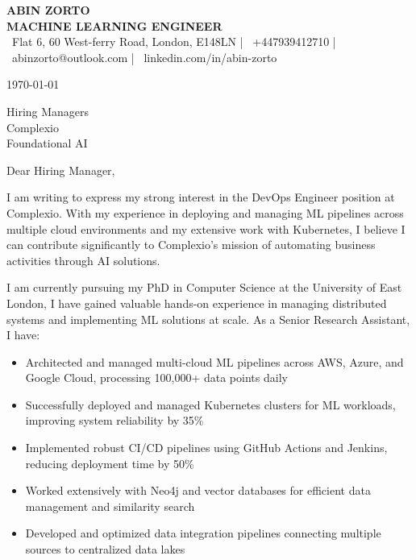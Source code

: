 \documentclass[10pt,a4paper]{article}
\begin{document}

\begin{center}
    {\color{primary}\Large\textbf{ABIN ZORTO}}\\[0.2em]
    {\color{secondary}\large\textbf{MACHINE LEARNING ENGINEER}}\\[0.3em]
    
    \small\color{secondary}
    \faMapMarker\ Flat 6, 60 West-ferry Road, London, E148LN |
    \faMobile\ +447939412710 |
    \faEnvelope\ abinzorto@outlook.com |
    \faLinkedin\ linkedin.com/in/abin-zorto
\end{center}

\vspace{1em}
\today

\vspace{1em}
Hiring Managers\\
Complexio\\
Foundational AI

\vspace{1em}
Dear Hiring Manager,

I am writing to express my strong interest in the DevOps Engineer position at Complexio. With my experience in deploying and managing ML pipelines across multiple cloud environments and my extensive work with Kubernetes, I believe I can contribute significantly to Complexio's mission of automating business activities through AI solutions.

I am currently pursuing my PhD in Computer Science at the University of East London, I have gained valuable hands-on experience in managing distributed systems and implementing ML solutions at scale. As a Senior Research Assistant, I have:

\begin{itemize}
    \item Architected and managed multi-cloud ML pipelines across AWS, Azure, and Google Cloud, processing 100,000+ data points daily
    \item Successfully deployed and managed Kubernetes clusters for ML workloads, improving system reliability by 35\%
    \item Implemented robust CI/CD pipelines using GitHub Actions and Jenkins, reducing deployment time by 50\%
    \item Worked extensively with Neo4j and vector databases for efficient data management and similarity search
    \item Developed and optimized data integration pipelines connecting multiple sources to centralized data lakes
\end{itemize}
\end{document}
